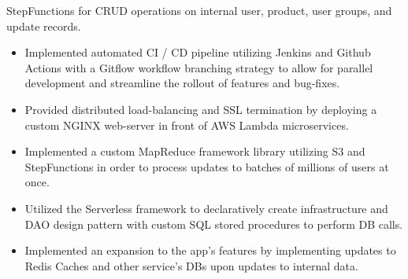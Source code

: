 \documentclass{ExpressiveResume}
\begin{document}
{{{            StepFunctions for CRUD operations on internal user, product, user
            groups, and update records.
            \begin{itemize}
                \item Implemented automated CI / CD pipeline utilizing
                      Jenkins and Github Actions with a Gitflow workflow
                      branching strategy to allow for parallel development
                      and streamline the rollout of features and bug-fixes.
                \item Provided distributed load-balancing and SSL
                      termination by deploying a custom NGINX web-server in
                      front of AWS Lambda microservices.
                \item Implemented a custom MapReduce framework library
                      utilizing S3 and StepFunctions in order to process
                      updates to batches of millions of users at once.
                \item Utilized the Serverless framework to declaratively
                      create infrastructure and DAO design pattern with custom
                      SQL stored procedures to perform DB calls.
                \item Implemented an expansion to the app's features by
                      implementing updates to Redis Caches and other service's
                      DBs upon updates to internal data.
            \end{itemize}
        }


    }
}
\end{document}
